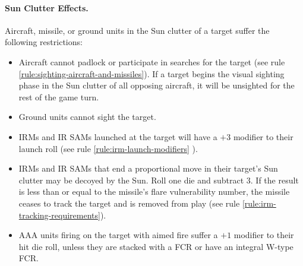 \begin{advancedrules}
{\paragraph{Sun Clutter Effects.} Aircraft, missile, or ground units in the Sun clutter of a target suffer the following restrictions:
\begin{itemize}
\item 
Aircraft cannot padlock or participate in searches for the target (see rule \ref{rule:sighting-aircraft-and-missiles}). If a target begins the visual sighting phase in the Sun clutter of all opposing aircraft, it will be unsighted for the rest of the game turn.
\item
Ground units cannot sight the target.
\item 
IRMs and IR SAMs launched at the target will have a $+3$ modifier to their launch roll (see rule \ref{rule:irm-launch-modifiers}
).
\item
IRMs and IR SAMs that end a proportional move in their target’s Sun clutter may be decoyed by the Sun. Roll one die and subtract 3. If the result is less than or equal to the missile’s flare vulnerability number, the missile ceases to track the target and is removed from play (see rule \ref{rule:irm-tracking-requirements}).
\item
AAA units firing on the target with aimed fire suffer a $+1$ modifier to their hit die roll, unless they are stacked with a FCR or have an integral W-type FCR.
\end{itemize}
}

\end{advancedrules}
